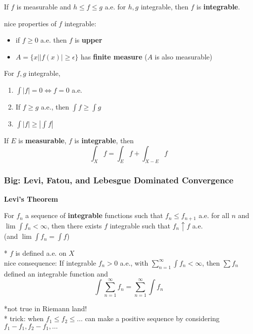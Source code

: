 \documentclass[a4paper, 12pt]{article}
\newcommand{\abs}[1]{\left\vert#1\right\vert} %
\newcommand{\bt}[1]{\textbf{#1}} %
\newcommand{\gray}[1]{{\leavevmode\color[gray]{0.5}{#1}}} %
\begin{document}
\begin{multicols}{2}
If $f$ is measurable and $h \leq f \leq g$ a.e. for $h, g$ integrable, then 
$f$ is \bt{integrable}.\\
\gray{``measurable sandwiched between integrable is integrable"}

nice properties of $f$ integrable:
\begin{itemize}
    \item if $f \geq 0$ a.e. then $f$ is \bt{upper}
    \item $A = \{x | |f(x)| \geq \epsilon\}$ has \bt{finite measure} ($A$ is also measurable) \\
               \gray{b/c: $|f|$ is measurable so $|f|^{-1}(\epsilon, \infty)$}
\end{itemize}

For $f, g$ integrable, 

    \begin{enumerate}
        \item $\int |f| = 0 \iff f = 0$ a.e.
        \item If $f \geq g$ a.e., then $\int f \geq \int g$
        \item $\int |f| \geq \abs{\int f}$
    \end{enumerate}

If $E$ is \bt{measurable}, $f$ is \bt{integrable}, then 
$$\int_X f = \int_E f + \int_{X-E} f$$

\subsubsection{Big: Levi, Fatou, and Lebesgue Dominated Convergence}

\centerline{\bt{Levi's Theorem}}
For $f_n$ a sequence of \bt{integrable} functions such that 
$f_n \leq f_{n+1}$ a.e. for all $n$ and $\lim \int f_n < \infty$, then 
there exists $f$ integrable such that $f_n \uparrow f$ a.e.\\
(and $\lim \int f_n = \int f$)\\
\gray{``an integrable function waits at the top of an increasing sequence''}

* $f$ is defined a.e. on $X$ \\

nice consequence: 
If integrable $f_n > 0$ a.e., with $\sum_{n=1}^\infty \int f_n < \infty$, then 
$\sum f_n$ defined an integrable function and 
$$\int \sum_{n=1}^\infty f_n = \sum_{n=1}^\infty \int f_n$$

*not true in Riemann land!  \\
* trick: when $f_1 \leq f_2 \leq \dots$ can make a positive sequence by considering
$f_1 - f_1, f_2 - f_1, \dots$




\end{multicols}
\end{document}
